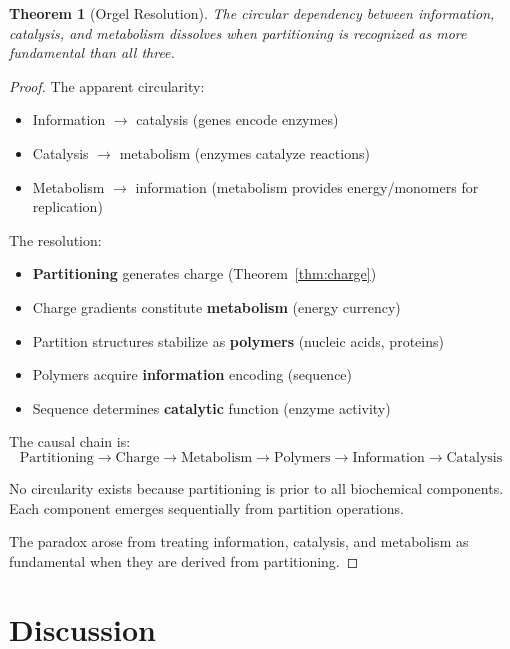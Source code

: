 \documentclass[twocolumn,10pt,a4paper]{article}
\newtheorem{theorem}{Theorem}[section]
\theoremstyle{definition}
\theoremstyle{remark}
\begin{document}
\begin{theorem}[Orgel Resolution]
\label{thm:orgel}
The circular dependency between information, catalysis, and metabolism dissolves when partitioning is recognized as more fundamental than all three.
\end{theorem}

\begin{proof}
The apparent circularity:
\begin{itemize}
    \item Information $\to$ catalysis (genes encode enzymes)
    \item Catalysis $\to$ metabolism (enzymes catalyze reactions)
    \item Metabolism $\to$ information (metabolism provides energy/monomers for replication)
\end{itemize}

The resolution:
\begin{itemize}
    \item \textbf{Partitioning} generates charge (Theorem~\ref{thm:charge})
    \item Charge gradients constitute \textbf{metabolism} (energy currency)
    \item Partition structures stabilize as \textbf{polymers} (nucleic acids, proteins)
    \item Polymers acquire \textbf{information} encoding (sequence)
    \item Sequence determines \textbf{catalytic} function (enzyme activity)
\end{itemize}

The causal chain is:
\begin{equation}
    \text{Partitioning} \to \text{Charge} \to \text{Metabolism} \to \text{Polymers} \to \text{Information} \to \text{Catalysis}
\end{equation}

No circularity exists because partitioning is prior to all biochemical components. Each component emerges sequentially from partition operations.

The paradox arose from treating information, catalysis, and metabolism as fundamental when they are derived from partitioning.
\end{proof}

\section{Discussion}
\label{sec:discussion}
\end{document}
